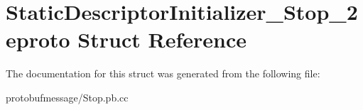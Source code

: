 \hypertarget{struct_static_descriptor_initializer___stop__2eproto}{\section{Static\-Descriptor\-Initializer\-\_\-\-Stop\-\_\-2eproto Struct Reference}
\label{struct_static_descriptor_initializer___stop__2eproto}
}


The documentation for this struct was generated from the following file\-:\begin{DoxyCompactItemize}
\item 
protobufmessage/Stop.\-pb.\-cc\end{DoxyCompactItemize}
